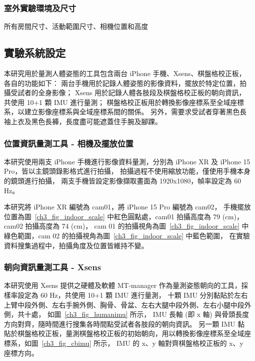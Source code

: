 \subsubsection{室外實驗環境及尺寸}
所有房間尺寸、活動範圍尺寸、相機位置和高度

\subsection{實驗系統設定}
本研究用於量測人體姿態的工具包含兩台 iPhone 手機、Xsens、棋盤格校正板，各自的功能如下：
兩台手機用於記錄人體姿態的影像資料，擺放於特定位置，拍攝受試者的全身影像；
Xsens 用於記錄人體各肢段及棋盤格校正板的朝向資訊，共使用 10+1 顆 IMU 進行量測；
棋盤格校正板用於轉換影像座標系至全域座標系，以建立影像座標系與全域座標系間的關係。
另外，需要求受試者穿著黑色長袖上衣及黑色長褲，長度盡可能遮蓋住手腕及腳踝。


\subsubsection{位置資訊量測工具 - 相機及擺放位置}
本研究使用兩支 iPhone 手機進行影像資料量測，分別為 iPhone XR 及 iPhone 15 Pro，皆以主鏡頭錄影格式進行拍攝，
拍攝過程不使用縮放功能，僅使用手機本身的鏡頭進行拍攝，
兩支手機皆設定影像擷取畫面為 1920x1080，幀率設定為 60 Hz。

本研究將 iPhone XR 編號為 cam01，將 iPhone 15 Pro 編號為 cam02，
手機擺放位置為圖~\ref{ch3_fig_indoor_scale} 中紅色圓點處，cam01 拍攝高度為 79 (cm)，cam02 拍攝高度為 74 (cm)，
cam 01 的拍攝視角為圖~\ref{ch3_fig_indoor_scale} 中綠色範圍，cam 02 的拍攝視角為圖~\ref{ch3_fig_indoor_scale} 中藍色範圍，
在實驗資料搜集過程中，拍攝角度及位置皆維持不變。

\subsubsection{朝向資訊量測工具 - Xsens}
本研究使用 Xsens 提供之硬體及軟體 MT-manager 作為量測姿態朝向的工具，採樣率設定為 60 Hz，共使用 10+1 顆 IMU 進行量測，
十顆 IMU 分別黏貼於左右上臂中段外側、左右手腕外側、胸骨、骨盆、左右大腿中段外側、左右小腿中段外側，共十處，
如圖~\ref{ch3_fig_humanimu} 所示， IMU 長軸 (即 x 軸) 與骨頭長度方向對齊，隨時間進行搜集各時間點受試者各肢段的朝向資訊。
另一顆 IMU 黏貼於棋盤格校正板，量測棋盤格校正板的初始朝向，用以轉換影像座標系至全域座標系，如圖~\ref{ch3_fig_cbimu} 所示，
IMU 的 x、y 軸對齊棋盤格校正板的 x、y 座標方向。

